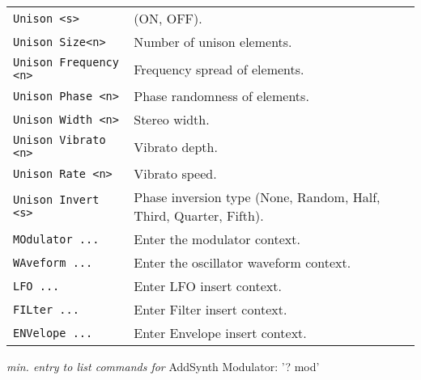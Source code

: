 \begin{table}[H]
\begin{tabular}{l l}
\texttt{Unison <s>} &
   (ON, OFF). \\
\texttt{Unison Size<n>} &
   Number of unison elements. \\
\texttt{Unison Frequency <n>} &
   Frequency spread of elements. \\
\texttt{Unison Phase <n>} &
   Phase randomness of elements. \\
\texttt{Unison Width <n>} &
   Stereo width. \\
\texttt{Unison Vibrato <n>} &
   Vibrato depth. \\
\texttt{Unison Rate <n>} &
   Vibrato speed. \\
\texttt{Unison Invert <s>} &
   Phase inversion type (None, Random, Half, Third, Quarter, Fifth). \\
\texttt{MOdulator ...} &
   Enter the modulator context. \\
\texttt{WAveform ...} &
   Enter the oscillator waveform context. \\
\texttt{LFO ...} &
   Enter LFO insert context.  \\
\texttt{FILter ...} &
   Enter Filter insert context.  \\
\texttt{ENVelope ...} &
   Enter Envelope insert context.   \\
      \end{tabular}
   \end{table}

\pagebreak
   \textsl{min. entry to list commands for} AddSynth Modulator: '? mod'

